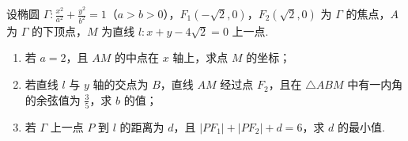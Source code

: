 \begin{problem}
设椭圆 \(\Gamma:\frac{x^2}{a^2}+\frac{y^2}{b^2}=1\)（\(a>b>0\)），\(F_1(-\sqrt2,0)\)，\(F_2(\sqrt2,0)\) 为 \(\Gamma\) 的焦点，\(A\) 为 \(\Gamma\) 的下顶点，\(M\) 为直线 \(l:x+y-4\sqrt2=0\) 上一点.
\begin{enumerate}
\item 若 \(a=2\)，且 \(AM\) 的中点在 \(x\) 轴上，求点 \(M\) 的坐标；
\item 若直线 \(l\) 与 \(y\) 轴的交点为 \(B\)，直线 \(AM\) 经过点 \(F_2\)，且在 \(\triangle ABM\) 中有一内角的余弦值为 \(\frac35\)，求 \(b\) 的值；
\item 若 \(\Gamma\) 上一点 \(P\) 到 \(l\) 的距离为 \(d\)，且 \(|PF_1|+|PF_2|+d=6\)，求 \(d\) 的最小值.
\end{enumerate}
\end{problem}

